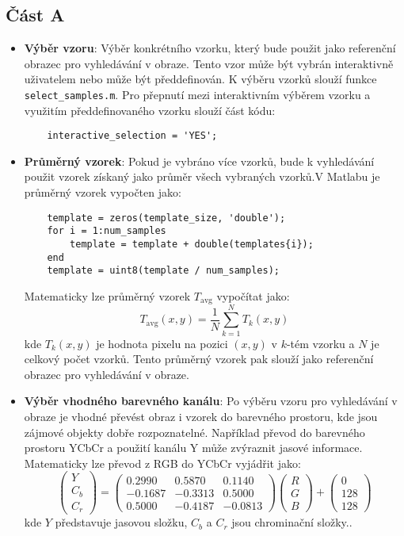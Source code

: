\subsection*{Část A}

\begin{itemize}
    \item \textbf{Výběr vzoru}: Výběr konkrétního vzorku, který bude použit jako referenční obrazec pro vyhledávání v obraze. Tento vzor může být vybrán interaktivně uživatelem nebo může být předdefinován. K výběru vzorků slouží funkce \texttt{select\_samples.m}. Pro přepnutí mezi interaktivním výběrem vzorku a využitím předdefinovaného vzorku slouží část kódu: 
    \begin{verbatim}
    interactive_selection = 'YES';
    \end{verbatim}
    
    \item \textbf{Průměrný vzorek}: Pokud je vybráno více vzorků, bude k vyhledávání použit vzorek získaný jako průměr všech vybraných vzorků.V Matlabu je průměrný vzorek vypočten jako:
    \begin{verbatim}
    template = zeros(template_size, 'double');
    for i = 1:num_samples
        template = template + double(templates{i});
    end
    template = uint8(template / num_samples);
    \end{verbatim}
    
    Matematicky lze průměrný vzorek \(T_{\text{avg}}\) vypočítat jako:
    \[
    T_{\text{avg}}(x, y) = \frac{1}{N} \sum_{k=1}^{N} T_k(x, y)
    \]
    kde \(T_k(x, y)\) je hodnota pixelu na pozici \((x, y)\) v \(k\)-tém vzorku a \(N\) je celkový počet vzorků. Tento průměrný vzorek pak slouží jako referenční obrazec pro vyhledávání v obraze.
    
    \item \textbf{Výběr vhodného barevného kanálu}: Po výběru vzoru pro vyhledávání v obraze je vhodné převést obraz i vzorek do barevného prostoru, kde jsou zájmové objekty dobře rozpoznatelné. Například převod do barevného prostoru YCbCr a použití kanálu Y může zvýraznit jasové informace. Matematicky lze převod z RGB do YCbCr vyjádřit jako:
    \[
    \begin{pmatrix}
    Y \\
    C_b \\
    C_r
    \end{pmatrix}
    =
    \begin{pmatrix}
    0.2990 & 0.5870 & 0.1140 \\
    -0.1687 & -0.3313 & 0.5000 \\
    0.5000 & -0.4187 & -0.0813
    \end{pmatrix}
    \begin{pmatrix}
    R \\
    G \\
    B
    \end{pmatrix}
    +
    \begin{pmatrix}
    0 \\
    128 \\
    128
    \end{pmatrix}
    \]
    kde \(Y\) představuje jasovou složku, \(C_b\) a \(C_r\) jsou chrominační složky.\cite{pIDhmNtdwMgbcGoe}.


\end{itemize}
